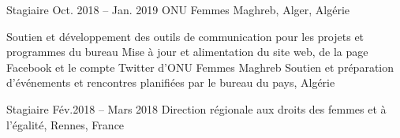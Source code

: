 %
%



\begin{joblist}

\item[Stagiaire]{Oct. 2018 -- Jan. 2019 }     
	{ONU Femmes Maghreb, Alger, Algérie}     
	{
			 
		\iftbftiny \setlength{\parskip}{-10pt} \fi
		\begin{itemize}
			  \iftbftiny \setlength\itemsep{-3pt} \fi
			  \cvitem[\checkmark] Soutien et développement des outils de communication pour les projets et programmes du bureau      
 			  \cvitem[\checkmark] Mise à jour et alimentation du site web, de la page Facebook et le compte Twitter d’ONU Femmes Maghreb                                                            
			  \cvitem[\checkmark] Soutien et préparation d’événements et rencontres planifiées par le bureau du pays, Algérie
		\end{itemize}      

	}


\item[Stagiaire]{Fév.2018 -- Mars 2018 }     
	{Direction régionale aux droits des femmes et à l'égalité, Rennes, France}     
	{
			 
}
\end{joblist}
